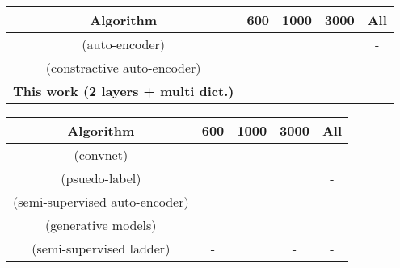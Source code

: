 \documentclass{article} \usepackage{iclr2016_workshop,times}
\begin{document}
\begin{table*}[ht!]

\caption{Classification error on MNIST.}
\label{mnist-results}
\begin{subtable}{\linewidth}
 \centering
 \caption{
 Algorithms that learn the filters unsupervised.}
\begin{tabular}{ccccc}
\multicolumn{1}{c}{\bf Algorithm}   &\multicolumn{1}{c}{\bf 600} &\multicolumn{1}{c}{\bf 1000} &\multicolumn{1}{c}{\bf 3000} &\multicolumn{1}{c}{\bf All}\\ \hline 
\cite{zhao2015stacked} (auto-encoder)                                   &       &         &         &- \\
\cite{rifai2011contractive} (constractive auto-encoder)            &       &         &       &\\
\textbf{This work (2 layers + multi dict.)}                                  &        &          &           & \\
 \hline


\end{tabular}
\end{subtable}

\vspace{4mm}

 \begin{subtable}{\linewidth}
 \centering
 \caption{Supervised and semi-supervised algorithms.}
\begin{tabular}{ccccc}
\multicolumn{1}{c}{\bf Algorithm} &\multicolumn{1}{c}{\bf 600} &\multicolumn{1}{c}{\bf 1000} &\multicolumn{1}{c}{\bf 3000}  &\multicolumn{1}{c}{\bf All}\\ \hline
 \cite{lecun1998gradient} (convnet)                                                         &                       &                     & \\  
  \cite{lee2013pseudo} (psuedo-label)                                                     &                       &                     &                    &- \\  
    \cite{zhao2015stacked} (semi-supervised auto-encoder)                   &                       &                     &                     &\\
  \cite{kingma2014semi} (generative models)                                         &                       &                      &                    &\\
  \cite{rasmus2015semi} (semi-supervised ladder)                                 &-                                     &                       &-                                   &- \\
   \hline

\end{tabular}
\end{subtable}
\end{table*}
\end{document}
